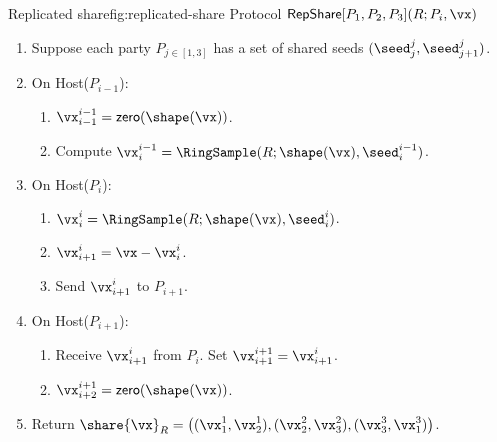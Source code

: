 
\begin{Boxfig}{Replicated share}{fig:replicated-share}
  {Protocol $\mathsf{RepShare}[P_1, P_2, P_3](R; P_i, \vx)$}
  
  \begin{enumerate}
  \item Suppose each party $P_{j \in [1, 3]}$ has a set of shared seeds $(\seed_j^j, \seed_{j+1}^j)$.
  \item On Host($P_{i-1}$):
  \begin{enumerate}
    \item $\vx_{i-1}^{i-1} = \mathsf{zero}(\shape(\vx))$.
    \item Compute $\vx_i^{i-1} = \RingSample(R; \shape(\vx), \seed_i^{i-1})$.
  \end{enumerate}
  \item On Host($P_i$):
  \begin{enumerate}
    \item $\vx_i^i = \RingSample(R; \shape(\vx), \seed_{i}^i)$.
    \item $\vx_{i+1}^i = \vx - \vx_i^i$.
    \item Send $\vx_{i+1}^i$ to $P_{i+1}$.
  \end{enumerate}
  \item On Host($P_{i+1}$):
  \begin{enumerate}
    \item Receive $\vx_{i+1}^i$ from $P_i$. Set $\vx_{i+1}^{i+1} = \vx_{i+1}^i$.
    \item $\vx_{i+2}^{i+1} = \mathsf{zero}(\shape(\vx))$.
  \end{enumerate}
   \item Return $\share{\vx}_R = \left( (\vx_1^1, \vx_2^1), (\vx_2^2, \vx_3^2), (\vx_3^3, \vx_1^3) \right)$.
  \end{enumerate}
\end{Boxfig}


